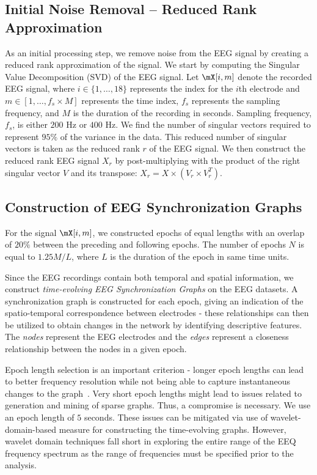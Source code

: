 \documentclass{article} %
\theoremstyle{definition}
\theoremstyle{remark}
\begin{document}
\subsection{Initial Noise Removal -- Reduced Rank Approximation}
As an initial processing step, we remove noise from the EEG signal by creating a reduced rank approximation of the signal.  We start by computing the Singular Value Decomposition (SVD) of the EEG signal.  Let $\mX[i,m]$ denote the recorded EEG signal, where $i\in\{1,\ldots,18\}$ represents the index for the $i$th electrode and $m\in\left[1,\ldots,f_s\times M\right]$ represents the time index, $f_s$ represents the sampling frequency, and $M$ is the duration of the recording in seconds.  Sampling frequency, $f_s$, is either $200$ Hz or $400$ Hz.  We find the number of singular vectors required to represent $95\%$ of the variance in the data.  This reduced number of singular vectors is taken as the reduced rank $r$ of the EEG signal.  We then construct the reduced rank EEG signal $X_r$ by post-multiplying with the product of the right singular vector $V$ and its transpose: $X_r = X\times(V_r \times V_r^T)$.

\subsection{Construction of EEG Synchronization Graphs} \label{sec:graph_construct}
For the signal $\mX[i,m]$, we constructed epochs of equal lengths with an overlap of $20\%$ between the  preceding and following epochs.  The number of epochs $N$ is equal to $1.25M/L$, where $L$ is the duration of the epoch in same time units.

Since the EEG recordings contain both temporal and spatial information, we construct {\em time-evolving EEG Synchronization Graphs} on the EEG datasets.  A synchronization graph is constructed for each epoch, giving an indication of the spatio-temporal correspondence between electrodes - these relationships can then be utilized to obtain changes in the network by identifying descriptive features.  The {\em nodes} represent the EEG electrodes and the {\em edges} represent a closeness relationship between the nodes in a given epoch.

Epoch length selection is an important criterion - longer epoch lengths can lead to better frequency resolution while not being able to capture instantaneous changes to the graph~\cite{vandeVelde:eeg_recordings,Levy:eeg_pow_spect_1986,Levy:eeg_pow_spect_1987}.  Very short epoch lengths might lead to issues related to generation and mining of sparse graphs.  Thus, a compromise is necessary.  We use an epoch length of $5$ seconds.  These issues can be mitigated via use of wavelet-domain-based measure for constructing the time-evolving graphs.  However, wavelet domain techniques fall short in exploring the entire range of the EEQ frequency spectrum as the range of frequencies must be specified prior to the analysis.
\end{document}
